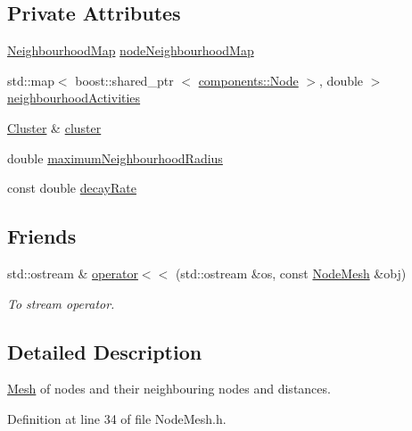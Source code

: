 \subsection*{\-Private \-Attributes}
\begin{DoxyCompactItemize}
\item 
\hyperlink{namespacecryomesh_1_1structures_a50c955c70377b1dc7d3fcf1364d5e33e}{\-Neighbourhood\-Map} \hyperlink{classcryomesh_1_1structures_1_1NodeMesh_a506e0ef94a257773bdfa68ef52d57387}{node\-Neighbourhood\-Map}
\item 
std\-::map$<$ boost\-::shared\-\_\-ptr\*
$<$ \hyperlink{classcryomesh_1_1components_1_1Node}{components\-::\-Node} $>$, double $>$ \hyperlink{classcryomesh_1_1structures_1_1NodeMesh_a7fdce4472420f0b1b5fd30edf230bded}{neighbourhood\-Activities}
\item 
\hyperlink{classcryomesh_1_1structures_1_1Cluster}{\-Cluster} \& \hyperlink{classcryomesh_1_1structures_1_1NodeMesh_a0f94d9777f9f9e2533b64881d59c225e}{cluster}
\item 
double \hyperlink{classcryomesh_1_1structures_1_1NodeMesh_a33f53d06bade0255a23c615f4229a631}{maximum\-Neighbourhood\-Radius}
\item 
const double \hyperlink{classcryomesh_1_1structures_1_1NodeMesh_aa7ce39158d506dcda63859ca1afb08dc}{decay\-Rate}
\end{DoxyCompactItemize}
\subsection*{\-Friends}
\begin{DoxyCompactItemize}
\item 
std\-::ostream \& \hyperlink{classcryomesh_1_1structures_1_1NodeMesh_acebf6afe649259a1e2eb991a8ee5167c}{operator$<$$<$} (std\-::ostream \&os, const \hyperlink{classcryomesh_1_1structures_1_1NodeMesh}{\-Node\-Mesh} \&obj)
\begin{DoxyCompactList}\small\item\em \-To stream operator. \end{DoxyCompactList}\end{DoxyCompactItemize}


\subsection{\-Detailed \-Description}
\hyperlink{classcryomesh_1_1structures_1_1Mesh}{\-Mesh} of nodes and their neighbouring nodes and distances. 

\-Definition at line 34 of file \-Node\-Mesh.\-h.




